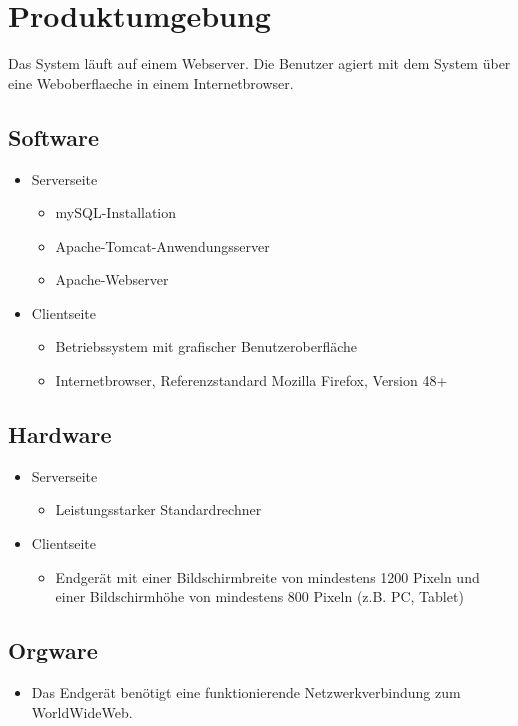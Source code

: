 \section{Produktumgebung}
Das System läuft auf einem Webserver. Die \gls{Benutzer} agiert mit dem System über eine \gls{Weboberflaeche} in einem \gls{Internetbrowser}.
\subsection{Software}
\begin{itemize}
	\item Serverseite
	\begin{itemize}
		\item mySQL-Installation
		\item Apache-Tomcat-Anwendungsserver
		\item Apache-Webserver
	\end{itemize}
	\item Clientseite
	\begin{itemize}
		\item Betriebssystem mit grafischer Benutzeroberfläche
		\item \gls{Internetbrowser}, Referenzstandard Mozilla Firefox, Version 48+
	\end{itemize}
\end{itemize}
\subsection{Hardware}
\begin{itemize}
	\item Serverseite
	\begin{itemize}
		\item Leistungsstarker Standardrechner
	\end{itemize}
	\item Clientseite
	\begin{itemize}
		\item Endgerät mit einer Bildschirmbreite von mindestens 1200 Pixeln und einer Bildschirmhöhe von mindestens 800 Pixeln (z.B. PC, Tablet)
	\end{itemize}
\end{itemize}
\subsection{Orgware}
\begin{itemize}
	\item Das Endgerät benötigt eine funktionierende Netzwerkverbindung zum WorldWideWeb.
\end{itemize}